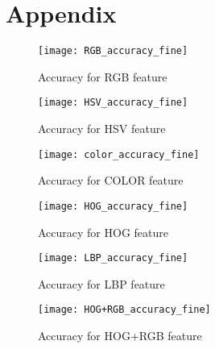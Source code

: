 \part*{Appendix}


\FloatBarrier
\begin{figure}[!tbp]
	\begin{minipage}[b]{0.4\textwidth}
		\texttt{[image: RGB\_accuracy\_fine]}
		\caption{Accuracy for RGB feature}
	\end{minipage}
	\hfill
	\begin{minipage}[b]{0.4\textwidth}
		\texttt{[image: HSV\_accuracy\_fine]}
		\caption{Accuracy for HSV feature}
	\end{minipage}
\end{figure}
\FloatBarrier

\FloatBarrier
\begin{figure}[!tbp]
	\begin{minipage}[b]{0.4\textwidth}
		\texttt{[image: color\_accuracy\_fine]}
		\caption{Accuracy for COLOR feature}
	\end{minipage}
	\hfill
	\begin{minipage}[b]{0.4\textwidth}
		\texttt{[image: HOG\_accuracy\_fine]}
		\caption{Accuracy for HOG feature}
	\end{minipage}
\end{figure}
\FloatBarrier

\FloatBarrier
\begin{figure}[!tbp]
	\begin{minipage}[b]{0.4\textwidth}
		\texttt{[image: LBP\_accuracy\_fine]}
		\caption{Accuracy for LBP feature}
	\end{minipage}
	\hfill
	\begin{minipage}[b]{0.4\textwidth}
		\texttt{[image: HOG+RGB\_accuracy\_fine]}
		\caption{Accuracy for HOG+RGB feature}
	\end{minipage}
\end{figure}
\FloatBarrier

